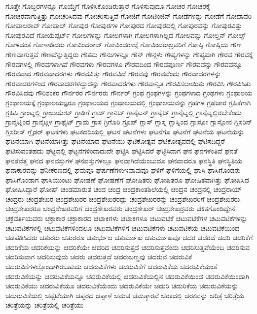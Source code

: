 {ಗೊತ್ತೇ
ಗೊಬ್ಬರಗಳನ್ನೂ
ಗೊಯ್ತೆಗೆ
ಗೊಳಿಸಿಕೊಂಡಿರುತ್ತಾರೆ
ಗೊಳಿಸುವುದೂ
ಗೋಚರ
ಗೋಚರಕ್ಕೆ
ಗೋಚರವಾಗುತ್ತಿತ್ತು
ಗೋಚರಿಸಿದವು
ಗೋಚರಿಸುತ್ತಿವೆ
ಗೋಜಿಗೆ
ಗೋಟಿಂಜಿನ್
ಗೋಡೆಗಳನ್ನು
ಗೋಡೆಗೆ
ಗೋದಾವರಿ
ಗೋಪಾಲರಾವ್
ಗೋಪಾಲ್
ಗೋಪುರ
ಗೋಪುರಗಳ
ಗೋಪುರದ
ಗೋಪುರದಲ್ಲಿ
ಗೋಪುರವನ್ನು
ಗೋಪುರವಿತ್ತು
ಗೋಪುರವಿದೆ
ಗೋಯೆಪ್ಪರ್ಟ್
ಗೋಲಗಳನ್ನು
ಗೋಲಗಳಾಗಿ
ಗೋಲಗಳಾಗಿಲ್ಲದ
ಗೋಲವನ್ನು
ಗೋಲ್ಡನ್
ಗೋಲ್ಫ್
ಗೋಳದಂತೆ
ಗೋಳಾಡಿದರು
ಗೋವಿಂದರಾಜ್
ಗೋವಿಂದರಾಜ್ಗೆ
ಗೋವಿಂದರಾಜ್ರವರಿಗೆ
ಗೋಷ್ಠಿ
ಗೋಷ್ಠಿಯ
ಗೌಣ
ಗೌಣವಾಗುತ್ತವೆ
ಗೌಣವೆನ್ನುತ್ತಿದ್ದರು
ಗೌತಮ
ಗೌನುಗಳನ್ನೂ
ಗೌನ್
ಗೌನ್ಗಳು
ಗೌಪ್ಯಗಳನ್ನು
ಗೌಪ್ಯವಾಗಿ
ಗೌರವ
ಗೌರವಕ್ಕೆ
ಗೌರವಗಳಲ್ಲಿ
ಗೌರವಗಳಾಗಿವೆ
ಗೌರವಗಳು
ಗೌರವಗಳೂ
ಗೌರವದಿಂದ
ಗೌರವಪೂರ್ಣ
ಗೌರವವನ್ನು
ಗೌರವವನ್ನೂ
ಗೌರವವಾದ
ಗೌರವವಾದರಗಳು
ಗೌರವವಿತ್ತು
ಗೌರವವಿದೆ
ಗೌರವವು
ಗೌರವವೆಂದು
ಗೌರವಾದರಗಳನ್ನು
ಗೌರವಾದರಗಳಿಂದ
ಗೌರವಾದರಗಳಿದ್ದುದನ್ನು
ಗೌರವಾದರಗಳು
ಗೌರವಾನ್ವಿತ
ಗೌರವಿಸಲಾಯಿತು
ಗೌರವಿಸಿ
ಗೌರವಿಸಿತು
ಗೌರವಿಸಿದವು
ಗೌರಿಶಂಕರ
ಗೌರ್ನರರ
ಗೌರ್ನರರು
ಗೌರ್ನರ್
ಗ್ರಂಥ
ಗ್ರಂಥಗಳನ್ನು
ಗ್ರಂಥಗಳಾದ
ಗ್ರಂಥಗಳು
ಗ್ರಂಥಾಲಯ
ಗ್ರಂಥಾಲಯಕ್ಕೆ
ಗ್ರಂಥಾಲಯಜ್ಞರೂ
ಗ್ರಂಥಾಲಯದ
ಗ್ರಂಥಾಲಯದಲ್ಲಿ
ಗ್ರಂಥಾಲಯವನ್ನು
ಗ್ರಹಗಳ
ಗ್ರಹಚಾರ
ಗ್ರಹಿಕೆಗಾಗಿ
ಗ್ರಹಿಸಿ
ಗ್ರಾಂಟ್ನಲ್ಲಿ
ಗ್ರಾಜುಯೇಟ್
ಗ್ರಾಡಿಗೆ
ಗ್ರಾಡ್
ಗ್ರಾನಿಟ್
ಗ್ರಾನೈಟನ್
ಗ್ರಾನೈಟ್
ಗ್ರಾನೈಟ್ನಲ್ಲಿ
ಗ್ರಾನೈಟ್ನಲ್ಲಿರಬೇಕೆಂದು
ಗ್ರಾನೈಟ್ನಿಂದ
ಗ್ರಾನೈಟ್ಗಳ
ಗ್ರಾಫೈಟ್
ಗ್ರಾಮ
ಗ್ರಾಸ
ಗ್ರಿಗೊರಿ
ಗ್ರೂಪ್
ಗ್ಲಾಸ್
ಗ್ಲಾಸ್ನ
ಗ್ಲಾಸ್ನಿಂದ
ಗ್ಲಾಸ್ಗೋ
ಗ್ಲಾಸ್ಗೋನ
ಗ್ಲಿಸರಿನ್
ಗ್ಲಿಸರೀಸ್
ಗ್ಲೈಡರ್
ಘಟಕಗಳು
ಘಟಕದಡಿಯಲ್ಲಿ
ಘಟನೆ
ಘಟನೆಗಳು
ಘಟನೆಗೂ
ಘಟನೆಗೆ
ಘಟನೆಯ
ಘಟನೆಯನ್ನು
ಘಟನೆಯಾಗಿ
ಘಟನೆಯಾಗಿತ್ತು
ಘಟನೆಯಾದ
ಘಟನೆಯು
ಘಟಿಕೋತ್ಸವ
ಘಟಿಕೋತ್ಸವದಲ್ಲಿ
ಘಟಿಸದಿದ್ದರೆ
ಘಟಿಸುವಂತಹದು
ಘಟ್ಟದಲ್ಲಿ
ಘಟ್ಟನೆಗಳಿಂದಾದುದೇ
ಘಟ್ಟಿಸಿ
ಘಟ್ಟಿಸಿದರೆ
ಘಟ್ಟಿಸಿದಾಗ
ಘನ
ಘನಗಳಂತಿವೆ
ಘನತೆ
ಘನತೆವೆತ್ತ
ಘನದ
ಘನವಸ್ತುಗಳ
ಘನವಸ್ತುಗಳಲ್ಲೂ
ಘನವಾಗಿದೆಯೆಂಬುದೂ
ಘನವಾದರೂ
ಘನಸ್ಥಿತಿ
ಘನಸ್ಥಿತಿಯ
ಘನಾಕಾರವನ್ನು
ಘನೀಕರಣದಲ್ಲಿ
ಘಮವೂ
ಘರ್ಷಣೆಗಳುಇವಾವುವೂ
ಘಳಿಗೆ
ಘಳಿಗೆಯಲ್ಲಿ
ಘಾಸಿ
ಘಾಸಿಗೊಂಡರು
ಘಾಸಿಗೊಂಡಾಗ
ಘಾಸಿಯುಂಟು
ಘೋಷಣೆ
ಘೋಷಣೆಗೆ
ಘೋಷಿತರು
ಘೋಷಿತರೂ
ಘೋಷಿತವಾಗಿತ್ತು
ಘೋಷಿಸಿದ
ಘೋಷಿಸಿದ್ದಾರೆ
ಘೋಷ್
ಚಂಡಮಾರುತ
ಚಂದ
ಚಂದ್ರ
ಚಂದ್ರಕಾಂತಶಿಲೆಯಲ್ಲಿ
ಚಂದ್ರನ
ಚಂದ್ರನಲ್ಲಿ
ಚಂದ್ರರಾಯ್
ಚಂದ್ರರು
ಚಂದ್ರಶೇಖರ
ಚಂದ್ರಶೇಖರರ
ಚಂದ್ರಶೇಖರರದ್ದು
ಚಂದ್ರಶೇಖರರನ್ನು
ಚಂದ್ರಶೇಖರರಿಗೆ
ಚಂದ್ರಶೇಖರರು
ಚಂದ್ರಶೇಖರರೂ
ಚಂದ್ರಶೇಖರವರಿಗೆ
ಚಂದ್ರಶೇಖರವರು
ಚಂದ್ರಶೇಖರ್
ಚಂದ್ರಶೇಖರ್ರವರು
ಚಕಿತಗೊಂಡಿದ್ದೇನೆ
ಚಕ್ರವರ್ತಿಯವರು
ಚಕ್ರಾಕಾರ
ಚಕ್ರಾಕಾರದ
ಚಟಾಕಿಗಳು
ಚಟಾಕಿಗಳೂ
ಚಟುವಟಿಕೆ
ಚಟುವಟಿಕೆಗಳ
ಚಟುವಟಿಕೆಗಳನ್ನು
ಚಟುವಟಿಕೆಗಳಲ್ಲಿ
ಚಟುವಟಿಕೆಗಳಿಂದಲೂ
ಚಟುವಟಿಕೆಗಳಿಗೆ
ಚಟುವಟಿಕೆಗಳು
ಚಟುವಟಿಕೆಯ
ಚಟುವಟಿಕೆಯಿಂದ
ಚಡಪಡಿಸಿದರು
ಚತುರರು
ಚತುರರೂ
ಚತುರ್ಭುಜ
ಚತುರ್ಮುಖ
ಚತುರ್ಮುಖವೂ
ಚದರ
ಚದರದೆ
ಚದರಿ
ಚದರಿಕೆಗೆ
ಚದರಿಕೆಯ
ಚದರಿಕೆಯನ್ನು
ಚದರಿಕೆಯೇ
ಚದರಿದ
ಚದರಿಸುತ್ತದೆ
ಚದರಿಸುತ್ತವೆಂದು
ಚದರಿಸುತ್ತವೆಯೆಂಬ
ಚದರಿಸುವ
ಚದರಿಸುವಾಗ
ಚದರಿಸುವುದು
ಚದರು
ಚದರುತ್ತದೆ
ಚದರುಬಣ್ಣವು
ಚದರುವ
ಚದರುವಿಕೆ
ಚದರುವಿಕೆಗಳಲ್ಲೊಂದಾಗಿರಬಹುದು
ಚದರುವಿಕೆಗಳು
ಚದರುವಿಕೆಗೆ
ಚದರುವಿಕೆಯ
ಚದರುವಿಕೆಯಂತೆ
ಚದರುವಿಕೆಯನ್ನು
ಚದರುವಿಕೆಯನ್ನೂ
ಚದರುವಿಕೆಯಲ್ಲಿ
ಚದರುವಿಕೆಯಲ್ಲಿನ
ಚದರುವಿಕೆಯಿಂದ
ಚದರುವಿಕೆಯಿಂದಾಗಿ
ಚದರುವಿಕೆಯು
ಚದರುವಿಕೆಯೂ
ಚದರುವಿಕೆಯೆಂದು
ಚದರುವಿಕೆಯೇ
ಚದುರಿ
ಚದುರಿಕೆಯ
ಚದುರುವಿಕೆಯನ್ನು
ಚದುರುವಿಕೆಯಲ್ಲಿ
ಚಪ್ಪಟೆಯಾಗಿ
ಚಪ್ಪರದ
ಚಪ್ಪಾಳೆ
ಚಮಚ
ಚಮತ್ಕಾರವೆ
ಚರಕದಲ್ಲಿ
ಚರಕವನ್ನು
ಚರಿತ್ರೆ
ಚರಿತ್ರೆಯ
ಚರಿತ್ರೆಯನ್ನು
ಚರಿತ್ರೆಯಲ್ಲಿ
ಚರಿತ್ರೆಯು
}
